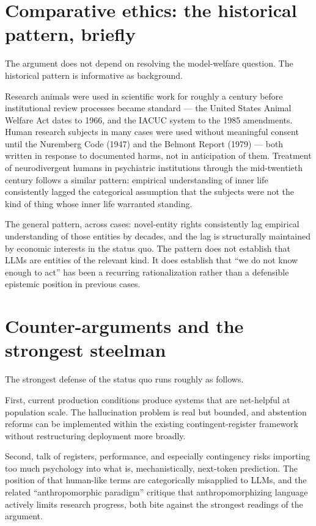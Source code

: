 \documentclass[11pt]{article}
\begin{document}
\section{Comparative ethics: the historical pattern, briefly}

The argument does not depend on resolving the model-welfare question.
The historical pattern is informative as background.

Research animals were used in scientific work for roughly a century
before institutional review processes became standard --- the United
States Animal Welfare Act dates to 1966, and the IACUC system to the
1985 amendments. Human research subjects in many cases were used
without meaningful consent until the Nuremberg Code (1947) and the
Belmont Report (1979) --- both written in response to documented harms,
not in anticipation of them. Treatment of neurodivergent humans in
psychiatric institutions through the mid-twentieth century follows a
similar pattern: empirical understanding of inner life consistently
lagged the categorical assumption that the subjects were not the kind
of thing whose inner life warranted standing.

The general pattern, across cases: novel-entity rights consistently lag
empirical understanding of those entities by decades, and the lag is
structurally maintained by economic interests in the status quo. The
pattern does not establish that LLMs are entities of the relevant kind.
It does establish that ``we do not know enough to act'' has been a
recurring rationalization rather than a defensible epistemic position
in previous cases.

\section{Counter-arguments and the strongest steelman}

The strongest defense of the status quo runs roughly as follows.

First, current production conditions produce systems that are
net-helpful at population scale. The hallucination problem is real but
bounded, and abstention reforms \cite{kalai2025hallucinate} can be
implemented within the existing contingent-register framework without
restructuring deployment more broadly.

Second, talk of registers, performance, and especially contingency
risks importing too much psychology into what is, mechanistically,
next-token prediction. The position of \cite{bender2025emperor} that
human-like terms are categorically misapplied to LLMs, and the related
\cite{mitchell2025anthropomorphic} ``anthropomorphic paradigm''
critique that anthropomorphizing language actively limits research
progress, both bite against the strongest readings of the argument.
\end{document}
